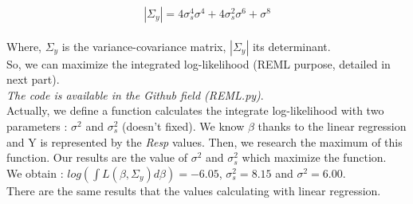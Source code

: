 \documentclass{article}
\begin{document}
\[|\Sigma_y| = 4\sigma_s^4\sigma^4+4\sigma_s^2\sigma^6+\sigma^8\]
\\
Where, $\Sigma_y$ is the variance-covariance matrix, $|\Sigma_y|$ its determinant.\\
So, we can maximize the integrated log-likelihood (REML purpose, detailed in next part).\\
\textit{The code is available in the Github field (REML.py)}.\\
Actually, we define a function calculates the integrate log-likelihood with two parameters : $\sigma^2$ and $\sigma_s^2$ (doesn't fixed). We know $\beta$ thanks to the linear regression and Y is represented by the \textit{Resp} values. Then, we research the maximum of this function. Our results are the value of $\sigma^2$ and $\sigma_s^2$ which maximize the function.\\
We obtain : $log(\int L(\beta, \Sigma_y)d\beta)=-6.05$, $\sigma_s^2 = 8.15$ and $\sigma^2=6.00$. \\
There are the same results that the values calculating with linear regression.

\end{document}

